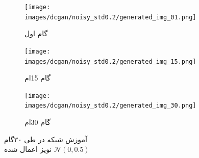 \documentclass[12pt, a4paper]{book}
\begin{document}
\begin{figure}[h]
    \begin{subfigure}{0.3\linewidth}
        \texttt{[image: images/dcgan/noisy\_std0.2/generated\_img\_01.png]}
        \caption{گام اول}
    \end{subfigure}
    \begin{subfigure}{0.3\linewidth}
        \texttt{[image: images/dcgan/noisy\_std0.2/generated\_img\_15.png]}
        \caption{گام 15ام}
    \end{subfigure}
    \begin{subfigure}{0.3\linewidth}
        \texttt{[image: images/dcgan/noisy\_std0.2/generated\_img\_30.png]}
        \caption{گام 30ام}
    \end{subfigure}
    \caption{آموزش شبکه  در طی ۳۰گام\\ نویز اعمال شده $\mathcal{N}(0,0.5)$}
    \label{dcgan_noisy_std0.2}
\end{figure}
\end{document}
